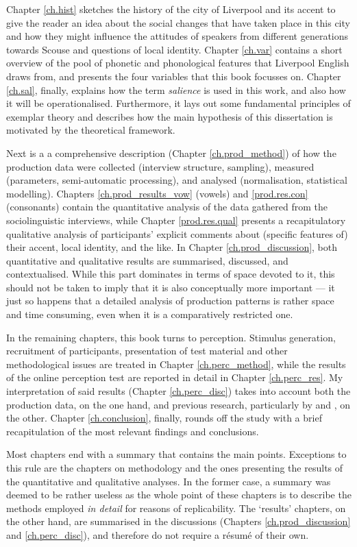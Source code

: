 Chapter \ref{ch.hist} sketches the history of the city of Liverpool and its accent to give the reader an idea about the social changes that have taken place in this city and how they might influence the attitudes of speakers from different generations towards Scouse and questions of local identity.
Chapter \ref{ch.var} contains a short overview of the pool of phonetic and phonological features that Liverpool English draws from, and presents the four variables that this book focusses on.
Chapter \ref{ch.sal}, finally, explains how the term \emph{salience} is used in this work, and also how it will be operationalised.
Furthermore, it lays out some fundamental principles of exemplar theory and describes how the main hypothesis of this dissertation is motivated by the theoretical framework.

Next is a a comprehensive description (Chapter \ref{ch.prod_method}) of how the production data were collected (interview structure, sampling), measured (parameters, semi-automatic processing), and analysed (normalisation, statistical modelling).
Chapters \ref{ch.prod_results_vow} (vowels) and \ref{prod.res.con} (consonants) contain the quantitative analysis of the data gathered from the sociolinguistic interviews, while Chapter \ref{prod.res.qual} presents a recapitulatory qualitative analysis of participants' explicit comments about (specific features of) their accent, local identity, and the like.
In Chapter \ref{ch.prod_discussion}, both quantitative and qualitative results are summarised, discussed, and contextualised.
While this part dominates in terms of space devoted to it, this should not be taken to imply that it is also conceptually more important --- it just so happens that a detailed analysis of production patterns is rather space and time consuming, even when it is a comparatively restricted one.

In the remaining chapters, this book turns to perception.
Stimulus generation, recruitment of participants, presentation of test material and other methodological issues are treated in Chapter \ref{ch.perc_method}, while the results of the online perception test are reported in detail in Chapter \ref{ch.perc_res}.
My interpretation of said results (Chapter \ref{ch.perc_disc}) takes into account both the production data, on the one hand, and previous research, particularly by \citeauthor{hayetal2006a} and \citeauthor{haydrager2010}, on the other.
Chapter \ref{ch.conclusion}, finally, rounds off the study with a brief recapitulation of the most relevant findings and conclusions.

Most chapters end with a summary that contains the main points.
Exceptions to this rule are the chapters on methodology and the ones presenting the results of the quantitative and qualitative analyses.
In the former case, a summary was deemed to be rather useless as the whole point of these chapters is to describe the methods employed \emph{in detail} for reasons of replicability.
The `results' chapters, on the other hand, are summarised in the discussions (Chapters \ref{ch.prod_discussion} and \ref{ch.perc_disc}), and therefore do not require a résumé of their own.